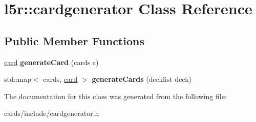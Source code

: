 \hypertarget{classl5r_1_1cardgenerator}{}\section{l5r\+:\+:cardgenerator Class Reference}
\label{classl5r_1_1cardgenerator}
\subsection*{Public Member Functions}
\begin{DoxyCompactItemize}
\item 
\mbox{\label{classl5r_1_1cardgenerator_a7a24e4a56f2759f8811df9d30ad21c22}} 
\hyperlink{classl5r_1_1card}{card} {\bfseries generate\+Card} (cards c)
\item 
\mbox{\label{classl5r_1_1cardgenerator_abe39bbf11e04d035cfdef3054173531e}} 
std\+::map$<$ cards, \hyperlink{classl5r_1_1card}{card} $>$ {\bfseries generate\+Cards} (decklist deck)
\end{DoxyCompactItemize}


The documentation for this class was generated from the following file\+:\begin{DoxyCompactItemize}
\item 
cards/include/cardgenerator.\+h\end{DoxyCompactItemize}
